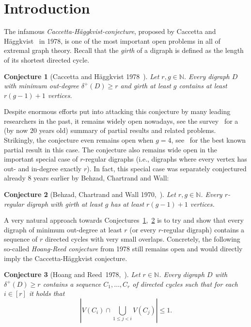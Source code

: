 \documentclass[a4paper,10pt]{article}
\newtheorem{conjecture}{Conjecture}
\begin{document}
\section{Introduction}
The infamous \emph{Caccetta-Häggkvist-conjecture}, proposed by Caccetta and Häggkvist~\cite{MR527946} in 1978, is one of the most important open problems in all of extremal graph theory. Recall that the \emph{girth} of a digraph is defined as the length of its shortest directed cycle.
\begin{conjecture}[Caccetta and Häggkvist 1978~\cite{MR527946}]\label{con:1}
Let $r,g\in \mathbb{N}$. Every digraph $D$ with minimum out-degree $\delta^+(D)\ge r$ and girth at least $g$ contains at least $r(g-1)+1$ vertices.
\end{conjecture}

Despite enormous efforts put into attacking this conjecture by many leading researchers in the past, it remains widely open nowadays, see the survey~\cite{sullivan2006} for a (by now $20$ years old) summary of partial results and related problems. Strikingly, the conjecture even remains open when $g=4$, see~\cite{MR3638333} for the best known partial result in this case. The conjecture also remains wide open in the important special case of $r$-regular digraphs (i.e., digraphs where every vertex has out- and in-degree exactly $r$). In fact, this special case was separately conjectured already 8 years earlier by Behzad, Chartrand and Wall:

\begin{conjecture}[Behzad, Chartrand and Wall 1970,~\cite{MR285448}]\label{con:2}
Let $r,g\in\mathbb{N}$. Every $r$-regular digraph with girth at least $g$ has at least $r(g-1)+1$ vertices.
\end{conjecture}

A very natural approach towards Conjectures~\ref{con:1},~\ref{con:2} is to try and show that every digraph of minimum out-degree at least $r$ (or every $r$-regular digraph) contains a sequence of $r$ directed cycles with very small overlaps. Concretely, the following so-called \emph{Hoang-Reed conjecture} from 1978 still remains open and would directly imply the Caccetta-Häggkvist conjecture.

\begin{conjecture}[Hoang and Reed~1978,~\cite{MR900933}]
Let $r\in \mathbb{N}$. Every digraph $D$ with $\delta^+(D)\ge r$ contains a sequence $C_1,\ldots,C_r$ of directed cycles such that for each $i\in [r]$ it holds that $$\left|V(C_i)\cap \bigcup_{1\le j<i}V(C_j)\right|\le 1.$$
\end{conjecture}
\end{document}
